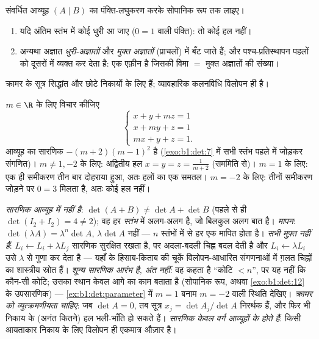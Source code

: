\begin{method}[निकायों पर गाउसीय विलोपन]\label{met:b1:det:gauss}
संवर्धित आव्यूह $(A \mid B)$ का पंक्ति-लघुकरण करके सोपानिक रूप तक
लाइए।
\begin{enumerate}
  \item यदि अंतिम स्तंभ में कोई धुरी आ जाए ($0 = 1$ वाली पंक्ति): तो कोई हल
  नहीं।
  \item अन्यथा अज्ञात \emph{धुरी-अज्ञातों} और \emph{मुक्त अज्ञातों}
  (प्राचलों) में बँट जाते हैं; और पश्च-प्रतिस्थापन पहलों को दूसरों में
  व्यक्त कर देता है:  एक एफ़ीन  है जिसकी विमा $=$ मुक्त
  अज्ञातों की संख्या।
\end{enumerate}
क्रामर के सूत्र सिद्धांत और छोटे निकायों के लिए हैं; व्यावहारिक कलनविधि
विलोपन ही है।
\end{method}

\begin{example}[प्राचल के साथ एक विवेचन]\label{ex:b1:det:parameter}
$m \in \R$ के लिए विचार कीजिए
\[
\begin{cases}
x + y + mz = 1\\
x + my + z = 1\\
mx + y + z = 1 .
\end{cases}
\]
आव्यूह का सारणिक $-(m+2)(m-1)^2$ है (\cref{exo:b1:det:7} में सभी स्तंभ पहले
में जोड़कर संगणित)। $m \neq 1, -2$ के लिए: अद्वितीय हल $x = y = z =
\frac{1}{m+2}$ (सममिति से)। $m = 1$ के लिए: एक ही समीकरण तीन बार दोहराया
हुआ, अतः हलों का एक समतल। $m = -2$ के लिए: तीनों समीकरण जोड़ने पर $0 = 3$
मिलता है, अतः कोई हल नहीं।
\end{example}

\begin{remark}[सामान्य भूलें]
\label{rem:b1:det:pitfalls}
\emph{सारणिक आव्यूह में  नहीं है}: $\det(A + B) \neq \det A + \det B$
(पहले से ही $\det(I_2 + I_2) = 4 \neq 2$); वह हर \emph{स्तंभ} में अलग-अलग
 है, जो बिलकुल अलग बात है। \emph{मापन}: $\det(\lambda A) =
\lambda^n\det A$, $\lambda\det A$ नहीं --- $n$ स्तंभों में से हर एक मापित
होता है। \emph{सभी  मुफ़्त नहीं हैं}: $L_i \leftarrow L_i +
\lambda L_j$ सारणिक सुरक्षित रखता है, पर अदला-बदली चिह्न बदल देती है और $L_i
\leftarrow \lambda L_i$ उसे $\lambda$ से गुणा कर देता है --- यहाँ के
हिसाब-किताब की चूकें विलोपन-आधारित संगणनाओं में ग़लत चिह्नों का शास्त्रीय
स्रोत हैं। \emph{शून्य सारणिक आरंभ है, अंत नहीं}: वह कहता है ``कोटि $< n$'',
पर यह नहीं कि कौन-सी कोटि; उसका स्थान केवल आगे का काम बताता है (सोपानिक रूप,
अथवा \cref{exo:b1:det:12} के उपसारणिक) --- \cref{ex:b1:det:parameter} में $m
= 1$ बनाम $m = -2$ वाली स्थिति देखिए। \emph{क्रामर को व्युत्क्रमणीयता
चाहिए}: जब $\det A = 0$, तब सूत्र $x_j = \det A_j/\det A$ निरर्थक हैं, और
फिर भी निकाय के (अनंत कितने) हल भली-भाँति हो सकते हैं। \emph{सारणिक केवल
वर्ग आव्यूहों के होते हैं}: किसी आयताकार निकाय के लिए विलोपन ही एकमात्र
औज़ार है।
\end{remark}

